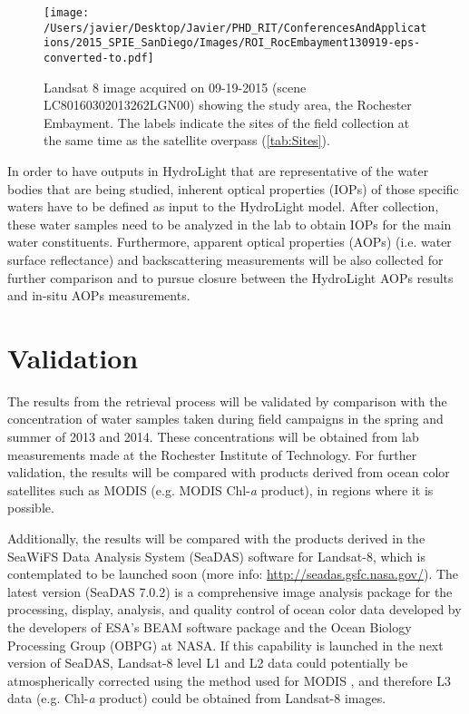 \begin{figure}[htbp!]
  \centering
  \texttt{[image: /Users/javier/Desktop/Javier/PHD\_RIT/ConferencesAndApplications/2015\_SPIE\_SanDiego/Images/ROI\_RocEmbayment130919-eps-converted-to.pdf]}
  \caption{Landsat 8 image acquired on 09-19-2015 (scene LC80160302013262LGN00) showing the study area, the Rochester Embayment. The labels indicate the sites of the field collection at the same time as the satellite overpass (\autoref{tab:Sites}).\label{fig:RrsROIs130919} } 
\end{figure}

In order to have outputs in HydroLight that are representative of the water bodies that are being studied, inherent optical properties (IOPs) of those specific waters have to be defined as input to the HydroLight model. After collection, these water samples need to be analyzed in the lab to obtain IOPs for the main water constituents. Furthermore, apparent optical properties (AOPs) (i.e. water surface reflectance) and backscattering measurements will be also collected for further comparison and to pursue closure between the HydroLight AOPs results and in-situ AOPs measurements.

\section{Validation}
The results from the retrieval process will be validated by comparison with the concentration of water samples taken during field campaigns in the spring and summer of 2013 and 2014. These concentrations will be obtained from lab measurements made at the Rochester Institute of Technology. For further validation, the results will be compared with products derived from ocean color satellites such as MODIS (e.g. MODIS Chl-{\it a} product), in regions where it is possible. 

Additionally, the results will be compared with the products derived in the SeaWiFS Data Analysis System (SeaDAS) software for Landsat-8, which is contemplated to be launched soon (more info: \url{http://seadas.gsfc.nasa.gov/}). The latest version (SeaDAS 7.0.2) is a comprehensive image analysis package for the processing, display, analysis, and quality control of ocean color data developed by the developers of ESA's BEAM software package and the Ocean Biology Processing Group (OBPG) at NASA. If this capability is launched in the next version of SeaDAS, Landsat-8 level L1 and L2 data could potentially be  atmospherically corrected using the method used for MODIS \cite{Gordon:1994,Ruddick:2000bs,Wang:2007dz}, and therefore L3 data (e.g. Chl-{\it a} product) could be obtained from Landsat-8 images.

